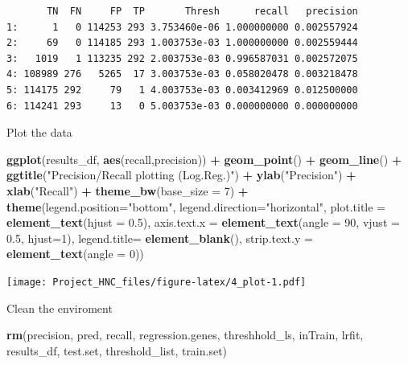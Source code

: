 \documentclass[]{article}
\newenvironment{Shaded}{\begin{snugshade}}{\end{snugshade}}
\newcommand{\KeywordTok}[1]{\textcolor[rgb]{0.13,0.29,0.53}{\textbf{#1}}}
\newcommand{\DataTypeTok}[1]{\textcolor[rgb]{0.13,0.29,0.53}{#1}}
\newcommand{\DecValTok}[1]{\textcolor[rgb]{0.00,0.00,0.81}{#1}}
\newcommand{\FloatTok}[1]{\textcolor[rgb]{0.00,0.00,0.81}{#1}}
\newcommand{\StringTok}[1]{\textcolor[rgb]{0.31,0.60,0.02}{#1}}
\newcommand{\OperatorTok}[1]{\textcolor[rgb]{0.81,0.36,0.00}{\textbf{#1}}}
\newcommand{\NormalTok}[1]{#1}
\begin{document}
\begin{verbatim}
       TN  FN     FP  TP       Thresh      recall   precision
1:      1   0 114253 293 3.753460e-06 1.000000000 0.002557924
2:     69   0 114185 293 1.003753e-03 1.000000000 0.002559444
3:   1019   1 113235 292 2.003753e-03 0.996587031 0.002572075
4: 108989 276   5265  17 3.003753e-03 0.058020478 0.003218478
5: 114175 292     79   1 4.003753e-03 0.003412969 0.012500000
6: 114241 293     13   0 5.003753e-03 0.000000000 0.000000000
\end{verbatim}

Plot the data

\begin{Shaded}
\begin{Highlighting}[]
\KeywordTok{ggplot}\NormalTok{(results_df, }\KeywordTok{aes}\NormalTok{(recall,precision)) }\OperatorTok{+}\StringTok{ }
\StringTok{  }\KeywordTok{geom_point}\NormalTok{() }\OperatorTok{+}\StringTok{ }
\StringTok{  }\KeywordTok{geom_line}\NormalTok{() }\OperatorTok{+}\StringTok{ }
\StringTok{  }\KeywordTok{ggtitle}\NormalTok{(}\StringTok{"Precision/Recall plotting (Log.Reg.)"}\NormalTok{) }\OperatorTok{+}
\StringTok{  }\KeywordTok{ylab}\NormalTok{(}\StringTok{"Precision"}\NormalTok{) }\OperatorTok{+}
\StringTok{  }\KeywordTok{xlab}\NormalTok{(}\StringTok{"Recall"}\NormalTok{) }\OperatorTok{+}
\StringTok{  }\KeywordTok{theme_bw}\NormalTok{(}\DataTypeTok{base_size =} \DecValTok{7}\NormalTok{) }\OperatorTok{+}
\StringTok{  }\KeywordTok{theme}\NormalTok{(}\DataTypeTok{legend.position=}\StringTok{"bottom"}\NormalTok{,}
        \DataTypeTok{legend.direction=}\StringTok{"horizontal"}\NormalTok{,}
        \DataTypeTok{plot.title =} \KeywordTok{element_text}\NormalTok{(}\DataTypeTok{hjust =} \FloatTok{0.5}\NormalTok{),}
        \DataTypeTok{axis.text.x =} \KeywordTok{element_text}\NormalTok{(}\DataTypeTok{angle =} \DecValTok{90}\NormalTok{, }\DataTypeTok{vjust =} \FloatTok{0.5}\NormalTok{, }\DataTypeTok{hjust=}\DecValTok{1}\NormalTok{),}
        \DataTypeTok{legend.title=} \KeywordTok{element_blank}\NormalTok{(),}
        \DataTypeTok{strip.text.y =} \KeywordTok{element_text}\NormalTok{(}\DataTypeTok{angle =} \DecValTok{0}\NormalTok{))}
\end{Highlighting}
\end{Shaded}

\texttt{[image: Project\_HNC\_files/figure-latex/4\_plot-1.pdf]}

Clean the enviroment

\begin{Shaded}
\begin{Highlighting}[]
\KeywordTok{rm}\NormalTok{(precision, pred, recall, regression.genes, threshhold_ls, inTrain, lrfit, results_df, test.set, threshold_list, train.set)}
\end{Highlighting}
\end{Shaded}
\end{document}
